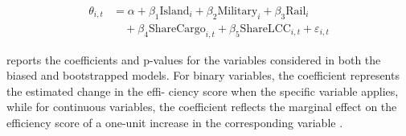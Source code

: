 \vspace{-0.6cm}
\begin{equation}
    \label{eq:complete_regression}
\begin{aligned}
\theta_{i,t} &= \alpha + \beta_1 \text{Island}_{i} + \beta_2 \text{Military}_{i} + \beta_3 \text{Rail}_{i} \\
&\quad + \beta_4 \text{ShareCargo}_{i,t} + \beta_5 \text{ShareLCC}_{i,t} + \varepsilon_{i,t}
\end{aligned}
\end{equation}

 reports the coefficients and p-values for the variables considered in both the biased and
bootstrapped models. For binary variables, the coefficient represents the estimated change in the effi-
ciency score when the specific variable applies, while for continuous variables, the coefficient reflects
the marginal effect on the efficiency score of a one-unit increase in the corresponding variable \cite{simar2007}.

